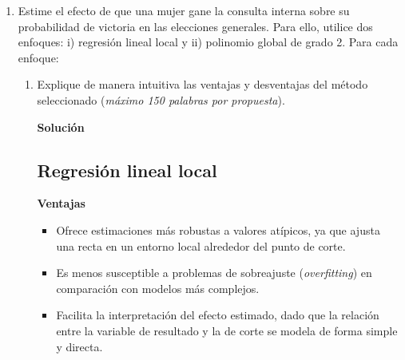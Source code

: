 \documentclass[a4paper, answers, addpoints, 11pt]{exam}
\newenvironment{solucion}{%
  \begin{mdframed}[
    backgroundcolor=blue!5,    %
    linecolor=blue!50,          %
    linewidth=2pt,              %
    leftmargin=10pt,            %
    rightmargin=8pt,           %
    topline=true,              %
    bottomline=true,            %
    roundcorner=10pt,           %
    innerleftmargin=10pt,       %
    innerrightmargin=10pt,      %
    innerbottommargin=10pt,     %
    innertopmargin=10pt         %
  ]%
  \begin{tcolorbox}[colframe=blue!50!black, colback=blue!50, coltitle=white, sharp corners=all, boxrule=1mm, width=\textwidth, halign=left, valign=center, top=0mm, bottom=0mm, left=0mm, right=0mm] \textbf{Solución} \end{tcolorbox} }{\end{mdframed}}
\begin{document}
\begin{enumerate}[resume]
\begin{enumerate}
\begin{solucion}
Este efecto sería indicativo de un sesgo de género que puede existir en la sociedad. En donde a los partidos que están nominando a hombres les va mejor que a los que están nominando mujeres. Una posible explicación de este sesgo de género puede atribuirse a pre-concepciones o diferencias en cuanto a la manera de hombre y mujeres de hacer política. Cuando las candidatas ganan las primarias con márgenes muy estrechos, no logran consolidar el respaldo total del partido, lo que podría llevar a divisiones internas, menor cohesión y pérdida de apoyo en la campaña general, a su vez pueden tener niveles de ética más elevados y pueden inclinarse por formas más convencionales y aceptables de hacer campaña. Por otro lado, cuando las mujeres pierden, es decir cuando los hombres ganan por margenes muy estrechos, pueden ser más arriesgados en la forma como hacen campaña y en algunas ocasiones poner en riesgo su candidatura.\\ 

Hay muchas teorías detrás y esta es solo una de ellas, pero el punto es que en el caso ideal uno esperaría no encontrar ningún efecto. Sin embargo, la gráfica enciende una preocupación sobre una posible desventaja que tengan las mujeres en el quehacer político e invita a reflexionar sobre las dinámicas internas de los partidos y posibles desigualdades de género en la política electoral
\end{solucion}
    \end{enumerate}

    \item Estime el efecto de que una mujer gane la consulta interna sobre su probabilidad de victoria en las elecciones generales. Para ello, utilice dos enfoques: i) regresión lineal local y ii) polinomio global de grado 2. Para cada enfoque:

    \begin{enumerate}

        \item Explique de manera intuitiva las ventajas y desventajas del método seleccionado (\textit{máximo 150 palabras por propuesta}).
\begin{solucion}
\subsection*{Regresión lineal local}
\textbf{Ventajas }

\begin{itemize}
     \item Ofrece estimaciones más robustas a valores atípicos, ya que ajusta una recta en un entorno local alrededor del punto de corte.
    \item Es menos susceptible a problemas de sobreajuste (\textit{overfitting}) en comparación con modelos más complejos.
    \item Facilita la interpretación del efecto estimado, dado que la relación entre la variable de resultado y la de corte se modela de forma simple y directa.
\end{itemize}


\end{solucion}
\end{enumerate}
\end{enumerate}
\end{document}
